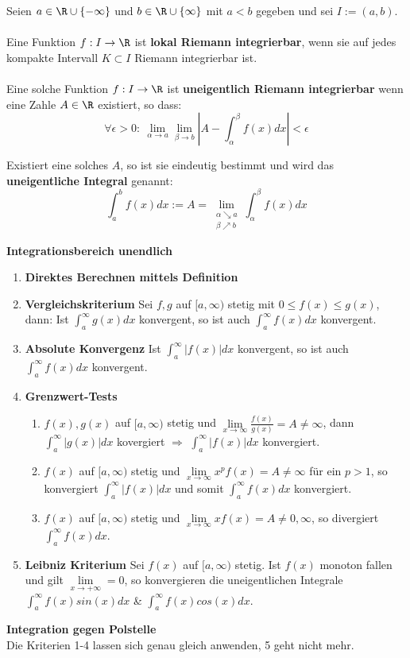 \begin{definition}
	Seien $a\in \R \cup \{-\infty\}$ und $b\in \R \cup \{\infty\}$ mit $a < b$ gegeben und sei $I := (a,b)$.
    \\\\
    Eine Funktion $f: I \to \R$ ist \textbf{lokal Riemann integrierbar}, wenn sie auf jedes kompakte Intervall $K \subset I$ Riemann integrierbar ist.
    \\\\
    Eine solche Funktion $f: I \to \R$ ist \textbf{uneigentlich Riemann integrierbar} wenn eine Zahle $A \in \R$ existiert, so dass:
    $$\forall \epsilon > 0: \ \lim_{\alpha \to a} \lim_{\beta \to b} |A - \int_\alpha^\beta f(x) dx| < \epsilon$$
    
    Existiert eine solches $A$,  so ist sie eindeutig bestimmt und wird das \textbf{uneigentliche Integral} genannt:
    $$\int_a^b f(x) dx := A = \lim_{\substack{\alpha \searrow a \\ \beta \nearrow b}} \int_\alpha^\beta f(x) dx$$
\end{definition}

\begin{theorem}
  \textbf{Integrationsbereich unendlich}
  \begin{enumerate}
      \item \textbf{Direktes Berechnen mittels Definition}
      \item \textbf{Vergleichskriterium} Sei $f,g$ auf $[a,\infty)$ stetig mit $0 \leq f(x) \leq g(x)$, dann: Ist $\int_a^{\infty}g(x)dx$ konvergent, so ist auch $\int_a^{\infty}f(x)dx$ konvergent.
      \item \textbf{Absolute Konvergenz} Ist $\int_a^{\infty}|f(x)|dx$ konvergent, so ist auch $\int_a^{\infty}f(x)dx$ konvergent.
      \item \textbf{Grenzwert-Tests}
      \begin{enumerate}
      	\item $f(x), g(x)$ auf $[a,\infty)$ stetig und $\lim\limits_{x\rightarrow\infty}\frac{f(x)}{g(x)} = A \neq \infty$, dann $\int_a^{\infty}|g(x)|dx$ kovergiert $\Rightarrow$ $\int_a^{\infty}|f(x)|dx$ konvergiert.
        \item $f(x)$ auf $[a,\infty)$ stetig und $\lim\limits_{x\rightarrow\infty}x^p f(x) = A \neq \infty$ für ein $p > 1$, so konvergiert $\int_a^{\infty}|f(x)|dx$ und somit $\int_a^{\infty}f(x)dx$ konvergiert.
        \item $f(x)$ auf $[a,\infty)$ stetig und $\lim\limits_{x\rightarrow\infty}x f(x) = A \neq 0,\infty$, so divergiert $\int_a^{\infty}f(x)dx$.
		\end{enumerate}
        \item \textbf{Leibniz Kriterium} Sei $f(x)$ auf $[a,\infty)$ stetig. Ist $f(x)$ monoton fallen und gilt $\lim\limits_{x\rightarrow+\infty}=0$, so konvergieren die uneigentlichen Integrale $\int_{a}^{\infty}f(x) sin(x) dx$ \& $\int_{a}^{\infty}f(x) cos(x) dx$.
  \end{enumerate}
  \textbf{Integration gegen Polstelle}\\
  Die Kriterien 1-4 lassen sich genau gleich anwenden, 5 geht nicht mehr.
\end{theorem}

